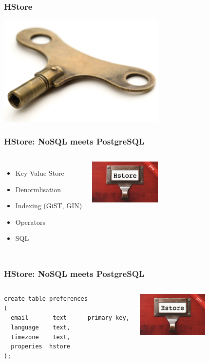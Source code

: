 \documentclass{beamer}
\begin{document}
\begin{frame}[fragile]
  \frametitle{HStore}

\begin{center}
  \includegraphics[height=15em]{clock-key.jpg}
\end{center}
\end{frame}

\begin{frame}[fragile]
  \frametitle{HStore: NoSQL meets PostgreSQL}

\begin{columns}
  \begin{itemize}
   \item Key-Value Store
   \item Denormlisation
   \item Indexing (GiST, GIN)
   \item Operators
   \item SQL
  \end{itemize}  
\begin{center}
  \includegraphics[height=6em]{hstore.png}
\end{center}
\end{columns}
\end{frame}

\begin{frame}[fragile]
  \frametitle{HStore: NoSQL meets PostgreSQL}

\begin{columns}
\begin{verbatim}
create table preferences
(
  email       text      primary key,
  language    text,
  timezone    text,
  properies  hstore
);
\end{verbatim}  
\begin{center}
  \includegraphics[height=6em]{hstore.png}
\end{center}
\end{columns}
\end{frame}
\end{document}
